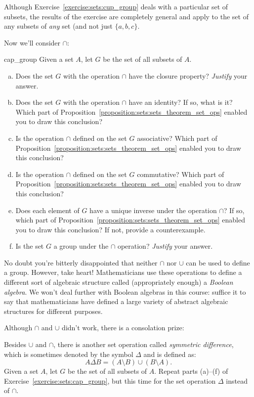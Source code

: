 Although Exercise~\ref{exercise:sets:cup_group} deals with a particular set of subsets,  the results of the  exercise are completely general and apply to the set of any subsets of \emph{any} set (and not just $\{a,b,c\}$.  
 
Now we'll consider $\cap$:

\begin{exercise}{cap_group}
Given a set $A$, let $G$ be the set of all subsets of $A$. 
\begin{enumerate}[(a)]
\item
Does the set $G$  with the operation $\cap$ have the closure property? \emph{Justify} your answer.
\item
Does the set $G$  with the operation $\cap$ have an identity? If so, what is it? Which part of  Proposition~\ref{proposition:sets:sets_theorem_set_ops} enabled you to draw this conclusion?
\item
Is the operation $\cap$ defined on the set $G$ associative? Which part of  Proposition~\ref{proposition:sets:sets_theorem_set_ops} enabled you to draw this conclusion?
\item
Is the operation $\cap$ defined on the set $G$ commutative? Which part of  Proposition~\ref{proposition:sets:sets_theorem_set_ops} enabled you to draw this conclusion?
\item
Does each element of $G$ have a unique inverse under the operation $\cap$? If so, which part of  Proposition~\ref{proposition:sets:sets_theorem_set_ops} enabled you to draw this conclusion? If not, provide a counterexample.
\item
Is the set $G$ a group under the $\cap$ operation?  \emph{Justify} your answer.
\end{enumerate}
\end{exercise} 
 

No doubt you're bitterly disappointed that neither $\cap$ nor $\cup$ can be used to define a group. However, take heart! Mathematicians use these operations to define a different sort of algebraic structure called (appropriately enough) a \emph{Boolean algebra}. We won't deal further with Boolean algebras in this course: suffice it to say that mathematicians have defined a large variety of abstract algebraic structures for different purposes.

Although $\cap$ and $\cup$ didn't work, there is a consolation prize:
 
\begin{exercise}{}
 Besides $\cup$ and $\cap$, there is another set operation called \emph{symmetric difference}, which is sometimes denoted by the symbol $\Delta$ and is defined as:
\begin{equation*}
A \Delta B = (A \setminus B) \cup (B\setminus A).
\end{equation*}
Given a set $A$, let $G$ be the set of all subsets of $A$.  Repeat parts (a)--(f) of Exercise~\ref{exercise:sets:cap_group}, but this time for the set operation $\Delta$ instead of $\cap$.
\end{exercise} 

